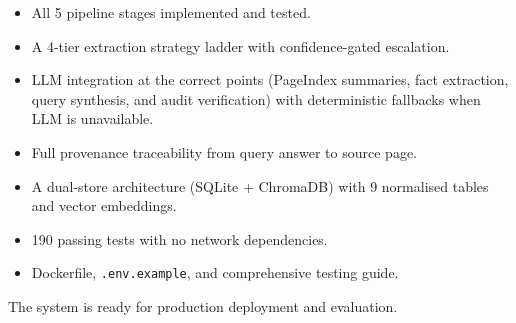\documentclass[12pt,a4paper]{article}
\begin{document}
\begin{itemize}[nosep]
    \item All 5 pipeline stages implemented and tested.
    \item A 4-tier extraction strategy ladder with confidence-gated escalation.
    \item LLM integration at the correct points (PageIndex summaries,
          fact extraction, query synthesis, and audit verification) with
          deterministic fallbacks when LLM is unavailable.
    \item Full provenance traceability from query answer to source page.
    \item A dual-store architecture (SQLite + ChromaDB) with 9 normalised
          tables and vector embeddings.
    \item 190 passing tests with no network dependencies.
    \item Dockerfile, \texttt{.env.example}, and comprehensive testing guide.
\end{itemize}

The system is ready for production deployment and evaluation.
\end{document}
